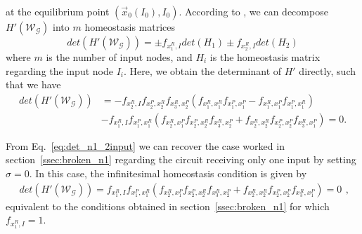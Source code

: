 at the equilibrium point $(\vec{x}_0(I_0), I_0)$. According to 
\cite{multi_input_antoneli2020}, we can decompose 
$H'({\mathcal{W}_{\mathcal{G}}})$ into $m$ homeostasis matrices
\begin{equation}
    det(H'(\mathcal{W}_{\mathcal{G}})) = 
    \pm f_{x_1^R, I}det(H_1) \pm f_{x_2^R, I}det(H_2)
\end{equation}
where $m$ is the number of input nodes, and $H_i$ is the 
homeostasis matrix regarding the input node $I_i$. Here, we 
obtain the determinant of $H'$ directly, such that we have 
\begin{equation} \label{eq:det_n1_2input}
    \begin{split}
        det(H'(\mathcal{W}_{\mathcal{G}})) &=  
    -f_{x_2^R, I}f_{x_2^P,x_2^R}f_{x_3^R, x_2^P}
    (f_{x_1^R,x_1^R}f_{x_1^P, x_1^P} - 
    f_{x_1^R,x_1^P}f_{x_1^P,x_1^R}) \\ 
    &-f_{x_1^R,I}f_{x_1^P,x_1^R}
    (f_{x_2^R, x_1^P}f_{x_2^P,x_2^R}f_{x_3^R,x_2^P} + 
    f_{x_2^R,x_2^R}f_{x_2^P,x_2^P}f_{x_3^R,x_1^P}) = 0.
    \end{split}
\end{equation}

From Eq.~\ref{eq:det_n1_2input} we can recover the case 
worked in section~\ref{ssec:broken_n1} regarding the circuit 
receiving only one input by setting $\sigma = 0$. In this 
case, the infinitesimal homeostasis condition is given
by
\begin{equation} \label{eq:det_n1_2input1}
    \begin{split}
        det(H'(\mathcal{W}_{\mathcal{G}})) =  
    f_{x_1^R,I}f_{x_1^P,x_1^R}
    (f_{x_2^R, x_1^P}f_{x_2^P,x_2^R}f_{x_3^R,x_2^P} + 
    f_{x_2^R,x_2^R}f_{x_2^P,x_2^P}f_{x_3^R,x_1^P}) = 0
    \end{split},
\end{equation}
equivalent to the conditions obtained in section~\ref{ssec:broken_n1}
for which $f_{x_1^R,I} = 1$.

